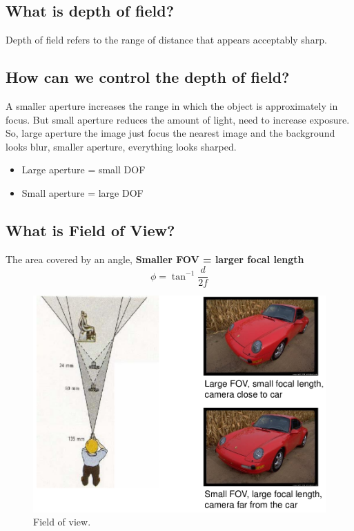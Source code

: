 \documentclass{article}
\begin{document}
\subsection{What is depth of field?}
Depth of field refers to the range of distance that appears acceptably sharp.

\subsection{How can we control the depth of field?}
A smaller aperture increases the range in which the object is approximately in focus. But small aperture reduces the amount of light, need to increase exposure. So, large aperture the image just focus the
nearest image and the background looks blur, smaller aperture, everything looks sharped.
\begin{itemize}
    \item Large aperture = small DOF
    \item Small aperture = large DOF
\end{itemize}

\subsection{What is Field of View?}
The area covered by an angle, \textbf{Smaller FOV = larger focal length}
\[\phi = \tan^{-1}\frac{d}{2f}\]

\begin{figure}[H]
\centering
\includegraphics[scale=0.3]{FOV.png}
\caption{Field of view.}
\label{fig:img2}
\end{figure}
\end{document}
